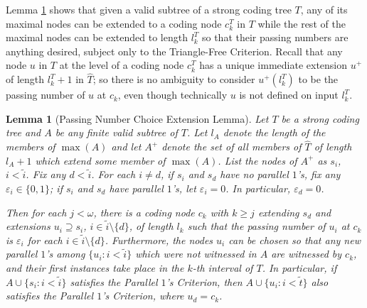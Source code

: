 \documentclass{amsart}
\newtheorem{lem}[thm]{Lemma}
\theoremstyle{remark}
\theoremstyle{definition}
\theoremstyle{remark}
\newcommand{\om}{\omega}
\newcommand{\contains}{\supseteq}
\newcommand{\POC}{Parallel $1$'s Criterion}
\begin{document}
Lemma \ref{lem.pnc} shows that given a valid subtree of a strong coding tree $T$,
any of its maximal nodes can be extended to a coding node $c_k^T$  in $T$ while the rest of the maximal nodes can be extended to length $l_k^T$ so that their passing numbers are anything desired,  subject only to the Triangle-Free Criterion.
Recall that any node  $u$ in $T$ at the level of a coding node $c_k^T$ has a unique immediate extension $u^+$  of length $l_k^T+1$ in $\widehat{T}$;
 so there is no ambiguity to
consider $u^+(l_k^T)$ to be the  passing number of $u$ at $c_k$, even though technically $u$ is not defined on input $l_k^T$.





\begin{lem}[Passing Number Choice Extension Lemma]\label{lem.pnc}
Let $T$ be a strong coding tree and
$A$ be any finite valid subtree of  $T$.
Let $l_A$ denote the length of the members of $\max(A)$
and let $A^+$ denote  the set of all members of $\widehat{T}$ of length $l_A+1$  which extend some member of $\max(A)$.
 List the nodes of $A^+$ as $s_i$, $i<\tilde{i}$.
Fix any  $d<\tilde{i}$.
For each $i\ne d$,  if  $s_i$ and $s_d$  have no parallel $1$'s, fix any $\varepsilon_i\in\{0,1\}$;  if $s_i$ and $s_d$ have parallel $1$'s, let $\varepsilon_i=0$.
In particular, $\varepsilon_d=0$.



Then  for each $j<\om$,
there is a coding node $c_k$ with $k\ge j$
extending $s_d$
 and
 extensions $u_i\contains s_i$, $i\in\tilde{i}\setminus \{d\}$, of length $l_k$
such that
the passing number of $u_i$ at $c_k$ is $\varepsilon_i$
 for each $i\in \tilde{i}\setminus\{d\}$.
Furthermore,
the nodes $u_i$ can be chosen so that
any new parallel $1$'s among $\{u_i:i<\tilde{i}\}$ which were not witnessed in $A$ are
 witnessed by $c_k$, and their first instances take place in the $k$-th interval of $T$.
In particular, if $A\cup \{s_i:i<\tilde{i}\}$ satisfies the \POC, then  $A\cup\{u_i:i<\tilde{t}\}$ also satisfies the \POC, where $u_d=c_k$.
\end{lem}
\end{document}
